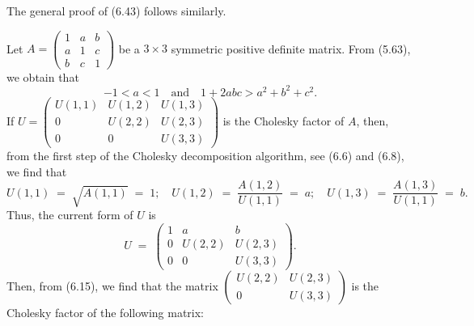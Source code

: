 
The general proof of (6.43) follows similarly.

Let $A = \begin{pmatrix} 1 & a & b \\ a & 1 & c \\ b & c & 1 \end{pmatrix}$ be a
$3 \times 3$ symmetric positive definite matrix. From (5.63), we obtain that
\begin{equation}
-1 < a < 1 \quad \text{and} \quad 1 + 2abc > a^2 + b^2 + c^2.
\end{equation}
If $U = \begin{pmatrix} U(1,1) & U(1,2) & U(1,3) \\ 0 & U(2,2) & U(2,3) \\ 0 & 0 &
U(3,3) \end{pmatrix}$ is the Cholesky factor of $A$, then, from the first step of the
Cholesky decomposition algorithm, see (6.6) and (6.8), we find that
\[
U(1,1) \;=\; \sqrt{A(1,1)} \;=\; 1; \quad U(1,2) \;=\; \frac{A(1,2)}{U(1,1)} \;=\; a;
\quad U(1,3) \;=\; \frac{A(1,3)}{U(1,1)} \;=\; b.
\]
Thus, the current form of $U$ is
\begin{equation}
U \;=\; \begin{pmatrix} 1 & a & b \\ 0 & U(2,2) & U(2,3) \\ 0 & 0 & U(3,3) \end{pmatrix}.
\end{equation}
Then, from (6.15), we find that the matrix $\begin{pmatrix} U(2,2) & U(2,3) \\ 0 &
U(3,3) \end{pmatrix}$ is the Cholesky factor of the following matrix:
